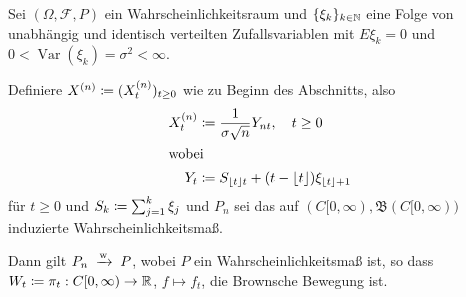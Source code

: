 \documentclass[a4paper,twoside,DIV15,BCOR12mm]{scrbook}
\newcommand{\cF}{\mathcal F}
\newcommand{\borel}{{\mathfrak B}}
\begin{document}
\begin{satz}
\label{satz:14.7}
Sei $(\Omega, \cF, P)$ ein Wahrscheinlichkeitsraum  und $\{\xi_k\}_{k\in\mathbb{N}}$ eine Folge von unabhängig und identisch verteilten Zufallsvariablen mit $E\xi_k=0$ und $0<\operatorname{Var}(\xi_k) = \sigma^2<\infty$.

Definiere $X^{(n)} \da (X_t^{(n)})_{t\ge 0}$ wie zu Beginn des Abschnitts, also
\begin{align*}
X_t^{(n)} &\da \frac1{\sigma \sqrt n} Y_{nt},\quad t\ge 0\\
\intertext{wobei}
Y_t &\da S_{\lfloor t\rfloor t} + (t-\lfloor t\rfloor)\xi_{\lfloor t\rfloor+1}
\end{align*}
für $t\ge 0$ und $S_k \da \sum_{j=1}^k \xi_j$ und $P_n$ sei das auf $(C[0,\infty),\borel(C[0,\infty))$ induzierte Wahrscheinlichkeitsmaß.

Dann gilt $P_n\tonach{w}P$, wobei $P$ ein Wahrscheinlichkeitsmaß ist, so dass $W_t\da \pi_t : C[0,\infty) \to \MdR$, $f\mapsto f_t$, die Brownsche Bewegung ist.
\end{satz}
\end{document}
